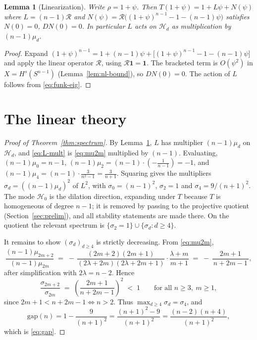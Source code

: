 \documentclass[11pt,reqno]{amsart}
\theoremstyle{plain}
\newtheorem{lemma}[theorem]{Lemma}
\theoremstyle{definition}
\newcommand{\Sph}{S^{n-1}}
\newcommand{\Rad}{\mathcal{R}}
\newcommand{\Hd}[1]{\mathcal{H}_{#1}}
\begin{document}
\begin{lemma}[Linearization]\label{lem:lin}
Write $\rho=1+\psi$. Then $T(1+\psi)=1+L\psi+N(\psi)$ where
$L=(n-1)\Rad$ and $N(\psi)=\Rad\big((1+\psi)^{n-1}-1-(n-1)\psi\big)$
satisfies $N(0)=0$, $DN(0)=0$. In particular $L$ acts on $\Hd d$ as
multiplication by $(n-1)\mu_d$.
\end{lemma}

\begin{proof}
Expand $(1+\psi)^{n-1}=1+(n-1)\psi+\big[(1+\psi)^{n-1}-1-(n-1)\psi\big]$ and
apply the linear operator $\Rad$, using $\Rad\mathbf 1=\mathbf 1$. The
bracketed term is $O(\psi^2)$ in $X=H^s(\Sph)$ (Lemma~\ref{lem:nl-bound}), so
$DN(0)=0$. The action of $L$ follows from \eqref{eq:funk-eig}.
\end{proof}

\section{The linear theory}\label{sec:linear}

\begin{proof}[Proof of Theorem~\ref{thm:spectrum}]
By Lemma~\ref{lem:lin}, $L$ has multiplier $(n-1)\mu_d$ on $\Hd d$, and
\eqref{eq:L-mult} is \eqref{eq:mu2m} multiplied by $(n-1)$. Evaluating,
$(n-1)\mu_0=n-1$, $(n-1)\mu_2=(n-1)\cdot(-\tfrac1{n-1})=-1$, and
$(n-1)\mu_4=(n-1)\cdot\tfrac{3}{n^2-1}=\tfrac{3}{n+1}$. Squaring gives the
multipliers $\sigma_d=((n-1)\mu_d)^2$ of $L^2$, with $\sigma_0=(n-1)^2$,
$\sigma_2=1$ and $\sigma_4=9/(n+1)^2$. The mode $\Hd0$ is the dilation
direction, expanding under $T$ because $T$ is homogeneous of degree $n-1$; it is
removed by passing to the projective quotient (Section~\ref{sec:prelim}), and
all stability statements are made there. On the quotient the relevant spectrum
is $\{\sigma_2=1\}\cup\{\sigma_d:d\ge4\}$.

It remains to show $(\sigma_d)_{d\ge4}$ is strictly decreasing. From
\eqref{eq:mu2m},
\[
   \frac{(n-1)\mu_{2m+2}}{(n-1)\mu_{2m}}
   \;=\;-\,\frac{(2m+2)(2m+1)}{(2\lambda+2m)(2\lambda+2m+1)}\cdot
        \frac{\lambda+m}{m+1}
   \;=\;-\,\frac{2m+1}{\,n+2m-1\,},
\]
after simplification with $2\lambda=n-2$. Hence
\[
   \frac{\sigma_{2m+2}}{\sigma_{2m}}\;=\;\left(\frac{2m+1}{n+2m-1}\right)^{2}
   \;<\;1\qquad\text{for all } n\ge 3,\ m\ge 1,
\]
since $2m+1<n+2m-1\Leftrightarrow n>2$. Thus $\max_{d\ge4}\sigma_d=\sigma_4$,
and
\[
   \mathrm{gap}(n)=1-\frac{9}{(n+1)^2}=\frac{(n+1)^2-9}{(n+1)^2}
   =\frac{(n-2)(n+4)}{(n+1)^2},
\]
which is \eqref{eq:gap}.
\end{proof}
\end{document}
